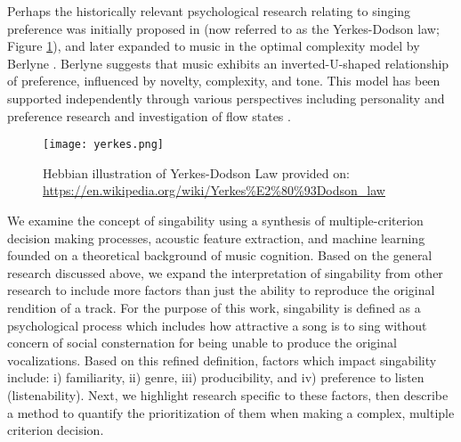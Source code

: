 Perhaps the historically relevant psychological research relating to singing preference was initially proposed in \cite{yerkes1908relation} (now referred to as the Yerkes-Dodson law; Figure \ref{fig:yerkes}), and later expanded to music in the optimal complexity model by Berlyne \cite{berlyne1970novelty}. Berlyne suggests that music exhibits an inverted-U-shaped relationship of preference, influenced by novelty, complexity, and tone. This model has been supported independently through various perspectives including personality and preference research \cite{north1995subjective} and investigation of flow states \cite{csikszentmihalyi1996flow}. 

\begin{figure}
\texttt{[image: yerkes.png]}
\caption{Hebbian illustration of Yerkes-Dodson Law provided on: \url{https://en.wikipedia.org/wiki/Yerkes\%E2\%80\%93Dodson_law}}\label{fig:yerkes}
\end{figure}

We examine the concept of singability using a synthesis of multiple-criterion decision making processes, acoustic feature extraction, and machine learning founded on a theoretical background of music cognition. Based on the general research discussed above, we expand the interpretation of singability from other research \cite{mao2014song,mao2015competence} to include more factors than just the ability to reproduce the original rendition of a track. For the purpose of this work, singability is defined as a psychological process which includes how attractive a song is to sing without concern of social consternation for being unable to produce the original vocalizations. Based on this refined definition, factors which impact singability include: i) familiarity, ii) genre, iii) producibility, and iv) preference to listen (listenability). Next, we highlight research specific to these factors, then describe a method to quantify the prioritization of them when making a complex, multiple criterion decision.

